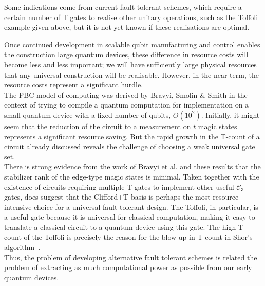 \documentclass{standalone}
\begin{document}
Some indications come from current fault-tolerant schemes, which require a certain number of T gates to realise other unitary operations, such as the Toffoli example given above, but it is not yet known if these realisations are optimal. 
\par
Once continued development in scalable qubit manufacturing and control enables the construction large quantum devices, these difference in resource costs will become less and less important; we will have sufficiently large physical resources that any universal construction will be realisable. However, in the near term, the resource costs represent a significant hurdle. \\
The PBC model of computing was derived by Bravyi, Smolin \& Smith in the context of trying to compile a quantum computation for implementation on a small quantum device with a fixed number of qubits, $O(10^{2})$. Initially, it might seem that the reduction of the circuit to a measurement on $t$ magic states represents a significant resource saving. But the rapid growth in the T-count of a circuit already discussed reveals the challenge of choosing a weak universal gate set. \\
There is strong evidence from the work of Bravyi et al. and these results that the stabilizer rank of the edge-type magic states is minimal. Taken together with the existence of circuits requiring multiple T gates to implement other useful $\mathcal{C}_{3}$ gates, does suggest that the Clifford+T basis is perhaps the most resource intensive choice for a universal fault tolerant design. The Toffoli, in particular, is a useful gate because it is universal for classical computation, making it easy to translate a classical circuit to a quantum device using this gate. The high T-count of the Toffoli is precisely the reason for the blow-up in T-count in Shor's algorithm~\cite{Fowler2003}. \\
Thus, the problem of developing alternative fault tolerant schemes is related the problem of extracting as much computational power as possible from our early quantum devices.
\ifstandalone

\fi
\end{document}

